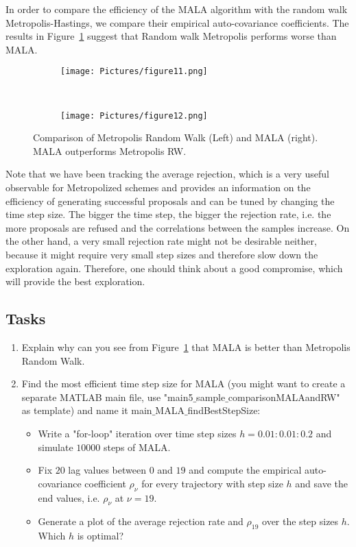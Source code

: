 \documentclass{scrartcl}
\begin{document}
In order to compare the efficiency of the MALA algorithm with the random walk Metropolis-Hastings, we compare their empirical auto-covariance coefficients. The results in Figure~\ref{comparisonMALARW} suggest that Random walk Metropolis performs worse than MALA.
\begin{figure}
    \centering
    \begin{subfigure}[b]{0.45\textwidth}
        \texttt{[image: Pictures/figure11.png]}
       \end{subfigure}
    ~    
     \begin{subfigure}[b]{0.45\textwidth}
        \texttt{[image: Pictures/figure12.png]}
    \end{subfigure}
    \caption{Comparison of Metropolis Random Walk (Left) and MALA (right). MALA outperforms Metropolis RW.}
    \label{comparisonMALARW}
  \end{figure}
  Note that we have been tracking the average rejection, which is a very useful observable for Metropolized schemes and provides an information on the efficiency of generating successful proposals and can be tuned by changing the time step size. The bigger the time step, the bigger the rejection rate, i.e. the more proposals are refused and the correlations between the samples increase. On the other hand, a very small rejection rate might not be desirable neither, because it might require very small step sizes and therefore slow down the exploration again. Therefore, one should think about a good compromise, which will provide the best exploration. 
  
  \subsection{Tasks}
 
\begin{enumerate}
 \item Explain why can you see from Figure~\ref{comparisonMALARW} that MALA is better than Metropolis Random Walk.
\item Find the most efficient time step size for MALA (you might want to create a separate MATLAB main file, use "main5$\_$sample$\_$comparisonMALAandRW" as template) and name it main$\_$MALA$\_$findBestStepSize: 
\begin{itemize}
\item Write a "for-loop" iteration over time step sizes $h=0.01:0.01:0.2$ and simulate $10000$ steps of MALA.
\item Fix $20$ lag values between $0$ and $19$ and compute the empirical auto-covariance coefficient $\rho_{\nu}$ for every trajectory with step size $h$ and save the end values, i.e. $\rho_{\nu}$ at $\nu=19$.
\item Generate a plot of the average rejection rate and $\rho_{19}$ over the step sizes $h$. Which $h$ is optimal?
\end{itemize}

\end{enumerate}
\end{document}
